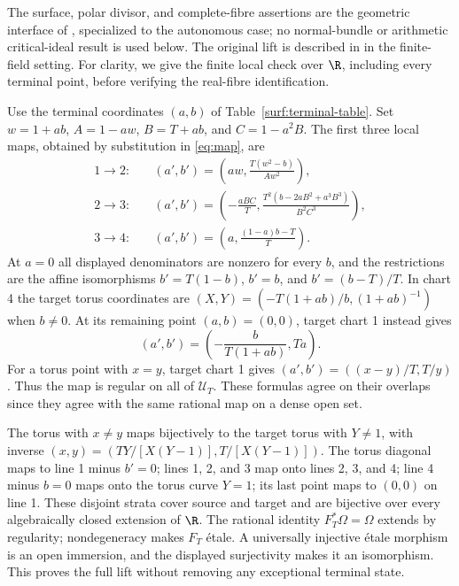 The surface, polar divisor, and complete-fibre assertions are the
geometric interface of \cite[Section 2]{QPI30Local2026}, specialized to
the autonomous case; no normal-bundle or arithmetic critical-ideal
result is used below. The original lift is described in
\cite[Section 2.1]{JoshiRoffelsen2026} in the finite-field setting.
For clarity, we give the finite local check over $\R$, including every
terminal point, before verifying the real-fibre identification.

Use the terminal coordinates $(a,b)$ of
Table~\ref{surf:terminal-table}. Set $w=1+ab$, $A=1-aw$,
$B=T+ab$, and $C=1-a^2B$. The first three local maps, obtained
by substitution in \eqref{eq:map}, are
\[
\begin{aligned}
 1\longrightarrow2:&\quad
 (a',b')=\left(aw,\frac{T(w^2-b)}{Aw^2}\right),\\
 2\longrightarrow3:&\quad
 (a',b')=\left(-\frac{aBC}{T},
 \frac{T^2(b-2aB^2+a^3B^3)}{B^2C^3}\right),\\
 3\longrightarrow4:&\quad
 (a',b')=\left(a,\frac{(1-a)b-T}{T}\right).
\end{aligned}
\]
At $a=0$ all displayed denominators are nonzero for every $b$,
and the restrictions are the affine isomorphisms
$b'=T(1-b)$, $b'=b$, and $b'=(b-T)/T$.
In chart 4 the target torus coordinates are
$(X,Y)=(-T(1+ab)/b,(1+ab)^{-1})$ when $b\ne0$.
At its remaining point $(a,b)=(0,0)$, target chart 1 instead gives
\[
 (a',b')=\left(-\frac{b}{T(1+ab)},Ta\right).
\]
For a torus point with $x=y$, target chart 1 gives
$(a',b')=((x-y)/T,T/y)$. Thus the map is regular on all of
$\mathcal U_T$. These formulas agree on their overlaps since they
agree with the same rational map on a dense open set.

The torus with $x\ne y$ maps bijectively to the target torus with
$Y\ne1$, with inverse $(x,y)=(TY/[X(Y-1)],T/[X(Y-1)])$.
The torus diagonal maps to line 1 minus $b'=0$; lines 1, 2, and 3
map onto lines 2, 3, and 4; line 4 minus $b=0$ maps onto the torus
curve $Y=1$; its last point maps to $(0,0)$ on line 1.
These disjoint strata cover source and target and are bijective over
every algebraically closed extension of $\R$.
The rational identity $F_T^*\Omega=\Omega$ extends by regularity;
nondegeneracy makes $F_T$ \'etale. A universally injective \'etale
morphism is an open immersion, and the displayed surjectivity makes
it an isomorphism. This proves the full lift without removing any
exceptional terminal state.

